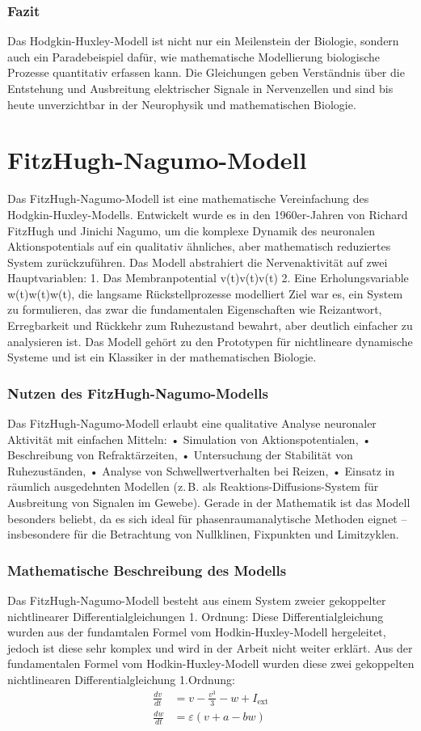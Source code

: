 \begin{refsection}
\subsubsection{Fazit}
Das Hodgkin-Huxley-Modell ist nicht nur ein Meilenstein der Biologie, sondern auch ein Paradebeispiel dafür, wie mathematische Modellierung biologische Prozesse quantitativ erfassen kann. Die Gleichungen geben Verständnis über die Entstehung und Ausbreitung elektrischer Signale in Nervenzellen und sind bis heute unverzichtbar in der Neurophysik und mathematischen Biologie.
\section{FitzHugh-Nagumo-Modell}
Das FitzHugh-Nagumo-Modell ist eine mathematische Vereinfachung des Hodgkin-Huxley-Modells. Entwickelt wurde es in den 1960er-Jahren von Richard FitzHugh und Jinichi Nagumo, um die komplexe Dynamik des neuronalen Aktionspotentials auf ein qualitativ ähnliches, aber mathematisch reduziertes System zurückzuführen.
Das Modell abstrahiert die Nervenaktivität auf zwei Hauptvariablen:
1.	Das Membranpotential v(t)v(t)v(t)
2.	Eine Erholungsvariable w(t)w(t)w(t), die langsame Rückstellprozesse modelliert
Ziel war es, ein System zu formulieren, das zwar die fundamentalen Eigenschaften wie Reizantwort, Erregbarkeit und Rückkehr zum Ruhezustand bewahrt, aber deutlich einfacher zu analysieren ist. Das Modell gehört zu den Prototypen für nichtlineare dynamische Systeme und ist ein Klassiker in der mathematischen Biologie.
\subsubsection{Nutzen des FitzHugh-Nagumo-Modells}
Das FitzHugh-Nagumo-Modell erlaubt eine qualitative Analyse neuronaler Aktivität mit einfachen Mitteln:
•	Simulation von Aktionspotentialen,
•	Beschreibung von Refraktärzeiten,
•	Untersuchung der Stabilität von Ruhezuständen,
•	Analyse von Schwellwertverhalten bei Reizen,
•	Einsatz in räumlich ausgedehnten Modellen (z. B. als Reaktions-Diffusions-System für Ausbreitung von Signalen im Gewebe).
Gerade in der Mathematik ist das Modell besonders beliebt, da es sich ideal für phasenraumanalytische Methoden eignet – insbesondere für die Betrachtung von Nullklinen, Fixpunkten und Limitzyklen.
\subsubsection{Mathematische Beschreibung des Modells}
Das FitzHugh-Nagumo-Modell besteht aus einem System zweier gekoppelter nichtlinearer Differentialgleichungen 1. Ordnung:
Diese Differentialgleichung wurden aus der fundamtalen Formel vom Hodkin-Huxley-Modell hergeleitet, jedoch ist diese sehr komplex und wird in der Arbeit nicht weiter erklärt. Aus der fundamentalen Formel vom Hodkin-Huxley-Modell wurden diese zwei gekoppelten nichtlinearen Differentialgleichung 1.Ordnung:
\[
\begin{aligned}
	\frac{dv}{dt} &= v - \frac{v^3}{3} - w + I_{\text{ext}} \\
	\frac{dw}{dt} &= \varepsilon (v + a - b w)
\end{aligned}
\]


\end{refsection}
